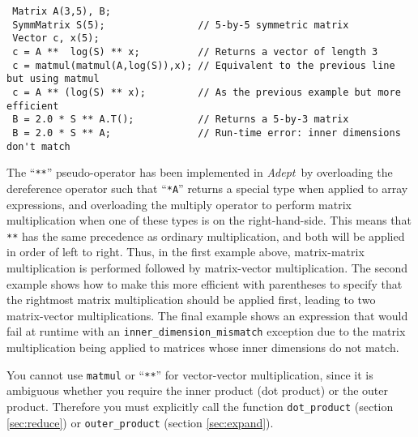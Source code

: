 \documentclass[a4,oneside]{book}
\def\codesize{\small}
\def\Adept{\emph{Adept}}
\def\code#1{{\codesize\texttt{#1}}}
\begin{document}
\begin{lstlisting}
 Matrix A(3,5), B;
 SymmMatrix S(5);                // 5-by-5 symmetric matrix
 Vector c, x(5);
 c = A **  log(S) ** x;          // Returns a vector of length 3
 c = matmul(matmul(A,log(S)),x); // Equivalent to the previous line but using matmul
 c = A ** (log(S) ** x);         // As the previous example but more efficient
 B = 2.0 * S ** A.T();           // Returns a 5-by-3 matrix
 B = 2.0 * S ** A;               // Run-time error: inner dimensions don't match
\end{lstlisting}
The ``\code{**}'' pseudo-operator has been implemented in \Adept\ by
overloading the dereference operator such that ``\code{*A}'' returns a
special type when applied to array expressions, and overloading the
multiply operator to perform matrix multiplication when one of these
types is on the right-hand-side. This means that \code{**} has the
same precedence as ordinary multiplication, and both will be applied
in order of left to right.  Thus, in the first example above,
matrix-matrix multiplication is performed followed by matrix-vector
multiplication. The second example shows how to make this more
efficient with parentheses to specify that the rightmost matrix
multiplication should be applied first, leading to two matrix-vector
multiplications.  The final example shows an expression that would
fail at runtime with an \code{inner\_dimension\_mismatch} exception
due to the matrix multiplication being applied to matrices whose inner
dimensions do not match.

You cannot use \code{matmul} or ``\code{**}'' for vector-vector
multiplication, since it is ambiguous whether you require the inner
product (dot product) or the outer product. Therefore you must
explicitly call the function \code{dot\_product} (section
\ref{sec:reduce}) or \code{outer\_product} (section \ref{sec:expand}).
\end{document}
